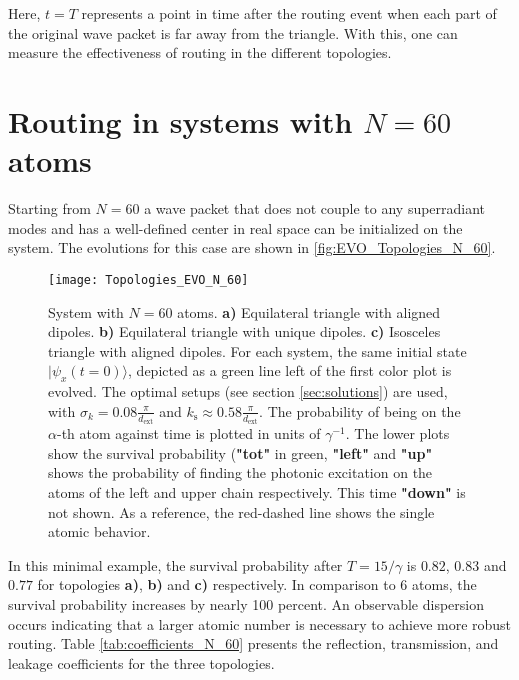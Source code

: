 \newpage
\noindent
Here, \(t=T\) represents a point in time after the routing event when each part of the original wave packet is far away from the triangle.
With this, one can measure the effectiveness of routing in the different topologies.


\newpage
\section{Routing in systems with \texorpdfstring{$N = 60$}{N = 60} atoms}
Starting from $N = 60$ a wave packet that does not couple to any superradiant modes and has a well-defined center in real space can be initialized on the system.
The evolutions for this case are shown in \autoref{fig:EVO_Topologies_N_60}.
\begin{figure}[!ht]
    \centering
    \texttt{[image: Topologies\_EVO\_N\_60]}
    \caption{System with $N = 60$ atoms.
    \textbf{a)} Equilateral triangle with aligned dipoles.
    \textbf{b)} Equilateral triangle with unique dipoles.
    \textbf{c)} Isosceles triangle with aligned dipoles.
    For each system, the same initial state$ \vert \psi_x(t = 0) \rangle $,
    depicted as a green line left of the first color plot is evolved.
    The optimal setups (see section
    \ref{sec:solutions}) are used, with $\sigma_k = 0.08 \frac{\pi}{d_\text{ext}}$ and $k_\text{s} \approx 0.58 \frac{\pi}{d_\text{ext}}$.
    The probability of being on the $ \alpha $-th atom against time is plotted in units of $ \gamma^{-1}$.
    The lower plots show the survival probability (\textbf{"tot"} in green, \textbf{"left"} and \textbf{"up"} shows the probability
        of finding the photonic excitation on the atoms of the left and upper chain respectively.
    This time \textbf{"down"} is not shown.
    As a reference, the red-dashed line shows the single atomic behavior.}
    \label{fig:EVO_Topologies_N_60}
\end{figure}


\noindent
In this minimal example, the survival probability after $T = 15 /\gamma$ is $0.82$, $0.83$
and $0.77$ for topologies \textbf{a)}, \textbf{b)} and \textbf{c)} respectively.
In comparison to $ 6 $ atoms, the survival probability increases by nearly 100 percent.
An observable dispersion occurs indicating that a larger atomic number is necessary to achieve more robust routing.
Table \ref{tab:coefficients_N_60} presents the reflection, transmission, and leakage coefficients for the three topologies.

